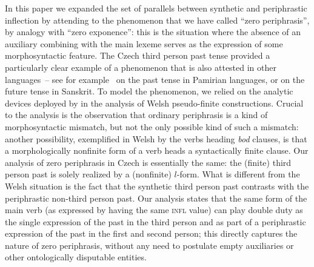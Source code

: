 \documentclass[output=paper]{langsci/langscibook}
\begin{document}
In this paper we expanded the set of parallels between synthetic and
periphras\-tic inflection by attending to the phenomenon that we have
called ``zero periphrasis'', by analogy with ``zero exponence'': this
is the situation where the absence of an auxiliary combining with the
main lexeme serves as the expression of some morphosyntactic
feature. The Czech third person past tense provided a particularly
clear example of a phenomenon that is also attested in other
languages~-- see for example \citet{Stump11} on the past tense in
Pamirian languages, or \citet{Stump13b} on the future tense in
Sanskrit. To model the phenomenon, we relied on the analytic devices
deployed by \citet{Bonami16b} in the analysis of Welsh pseudo-finite
constructions. Crucial to the analysis is the observation that
ordinary periphrasis is a kind of morphosyntactic mismatch, but not
the only possible kind of such a mismatch: another possibility,
exemplified in Welsh by the verbs heading \emph{bod} clauses, is that
a morphologically nonfinite form of a verb heads a syntactically
finite clause. Our analysis of zero periphrasis in Czech is
essentially the same: the (finite) third person past is solely
realized by a (nonfinite) $l$-form. What is different from the Welsh
situation is the fact that the synthetic third person past contrasts
with the periphrastic non-third person past. Our analysis states that
the same form of the main verb (as expressed by having the same
\textsc{infl} value) can play double duty as the single expression of
the past in the third person and as part of a periphras\-tic expression
of the past in the first and second person; this directly captures the
nature of zero periphrasis, without any need to postulate empty
auxiliaries or other ontologically disputable entities.\pagebreak
\end{document}
